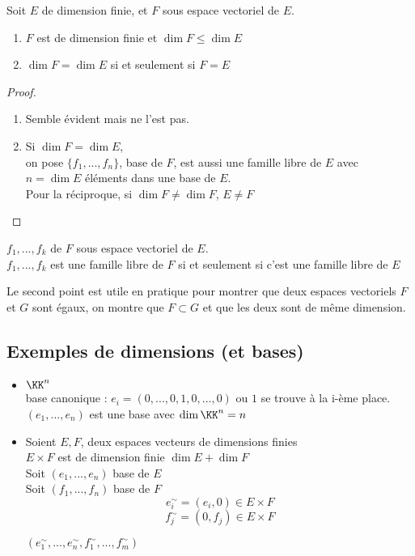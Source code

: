 \documentclass[../main.tex]{subfile}
\begin{document}
\begin{prop}
Soit $E$ de dimension finie, et $F$ sous espace vectoriel de $E$.\\
\begin{enumerate}	
	\item $F$ est de dimension finie et $\dim F \leq \dim E$
	\item $\dim F = \dim E$ si et seulement si $F = E$
\end{enumerate}
\end{prop}
\begin{proof}
\begin{enumerate}	
	\item Semble évident mais ne l'est pas.
	\item Si $\dim F = \dim E$, \\
	on pose $\{f_1, ..., f_n\}$, base de $F$, est aussi une famille libre de $E$ avec $n = \dim E$ éléments dans une base de $E$.\\
	Pour la réciproque, si $\dim F \neq \dim F$, $E \neq F$
\end{enumerate}
\end{proof}

\begin{rema}
	$f_1, ..., f_k$ de $F$ sous espace vectoriel de $E$.\\
	$f_1, ..., f_k$ est une famille libre de $F$ si et seulement si c'est une famille libre de $E$
\end{rema}

\begin{rema}
	Le second point est utile en pratique pour montrer que deux espaces vectoriels $F$ et $G$ sont égaux, on montre que $F \subset G$ et que les deux sont de même dimension.
\end{rema}

\subsection{Exemples de dimensions (et bases)}
\begin{itemize}
	\item $\KK^n$\\
	base canonique : $e_i = (0, ..., 0, 1, 0, ..., 0)$ ou $1$ se trouve à la i-ème place.\\
	$(e_1, ..., e_n)$ est une base avec $\dim \KK^n = n$

	\item Soient $E, F$, deux espaces vecteurs de dimensions finies \\
	$E \times F$ est de dimension finie $\dim E + \dim F$\\
	Soit $(e_1, ..., e_n)$ base de $E$\\
	Soit $(f_1, ..., f_n)$ base de $F$\\
	$$e_i^\sim = (e_i, 0) \in E \times F$$
	$$f_j^\sim = (0, f_j) \in E \times F$$

\begin{exerc}	
	$(e_1^\sim, ..., e_n^\sim, f_1^\sim, ..., f_m^\sim)$
\end{exerc}
\end{itemize}
\end{document}
